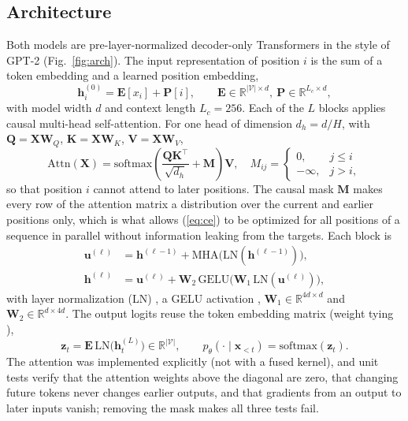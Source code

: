 \documentclass[journal]{IEEEtran}
\begin{document}
\subsection{Architecture}
Both models are pre-layer-normalized decoder-only Transformers in the style of GPT-2 \cite{radford2019gpt2} (Fig.~\ref{fig:arch}). The input representation of position $i$ is the sum of a token embedding and a learned position embedding,
\begin{equation}
\mathbf{h}^{(0)}_i = \mathbf{E}[x_i] + \mathbf{P}[i], \qquad \mathbf{E}\in\mathbb{R}^{|\mathcal{V}|\times d},\ \mathbf{P}\in\mathbb{R}^{L_c\times d},
\end{equation}
with model width $d$ and context length $L_c=256$. Each of the $L$ blocks applies causal multi-head self-attention. For one head of dimension $d_h=d/H$, with $\mathbf{Q}=\mathbf{X}\mathbf{W}_Q$, $\mathbf{K}=\mathbf{X}\mathbf{W}_K$, $\mathbf{V}=\mathbf{X}\mathbf{W}_V$,
\begin{equation}
\mathrm{Attn}(\mathbf{X}) = \mathrm{softmax}\!\left(\frac{\mathbf{Q}\mathbf{K}^{\top}}{\sqrt{d_h}} + \mathbf{M}\right)\mathbf{V},\quad
M_{ij}=\begin{cases}0, & j\le i\\ -\infty, & j>i,\end{cases}
\label{eq:attn}
\end{equation}
so that position $i$ cannot attend to later positions. The causal mask $\mathbf{M}$ makes every row of the attention matrix a distribution over the current and earlier positions only, which is what allows (\ref{eq:ce}) to be optimized for all positions of a sequence in parallel without information leaking from the targets. Each block is
\begin{align}
\mathbf{u}^{(\ell)} &= \mathbf{h}^{(\ell-1)} + \mathrm{MHA}\big(\mathrm{LN}(\mathbf{h}^{(\ell-1)})\big),\\
\mathbf{h}^{(\ell)} &= \mathbf{u}^{(\ell)} + \mathbf{W}_2\,\mathrm{GELU}\big(\mathbf{W}_1\,\mathrm{LN}(\mathbf{u}^{(\ell)})\big),
\end{align}
with layer normalization (LN) \cite{ba2016layernorm}, a GELU activation \cite{hendrycks2016gelu}, $\mathbf{W}_1\in\mathbb{R}^{4d\times d}$ and $\mathbf{W}_2\in\mathbb{R}^{d\times 4d}$. The output logits reuse the token embedding matrix (weight tying \cite{press2017tying}),
\begin{equation}
\mathbf{z}_t = \mathbf{E}\,\mathrm{LN}\big(\mathbf{h}^{(L)}_t\big) \in \mathbb{R}^{|\mathcal{V}|},\qquad
p_\theta(\cdot\mid\mathbf{x}_{<t}) = \mathrm{softmax}(\mathbf{z}_t).
\label{eq:logits}
\end{equation}
The attention was implemented explicitly (not with a fused kernel), and unit tests verify that the attention weights above the diagonal are zero, that changing future tokens never changes earlier outputs, and that gradients from an output to later inputs vanish; removing the mask makes all three tests fail.
\end{document}
